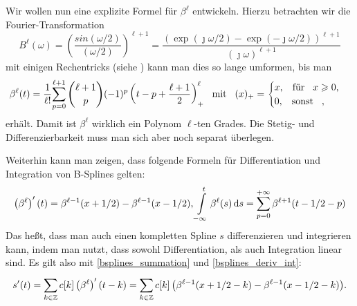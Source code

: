 Wir wollen nun eine explizite Formel f\"ur $\beta^\ell$ entwickeln. Hierzu betrachten wir die Fourier-Transformation 
\begin{equation}
    B^\ell(\omega) 
        = \left(\frac{sin(\omega / 2)}{(\omega / 2)}\right)^{\ell + 1}
        = \frac{(\exp(\jmath \omega/2) - \exp(-\jmath \omega/2))^{\ell+1}}{
            (\jmath \omega)^{\ell + 1}
        }
\end{equation}
mit einigen Rechentricks (siehe \cite[Box 1.]{unser1999splines_mag}) kann man dies so lange umformen, bis man
\begin{equation}
    \beta^\ell(t) = \frac{1}{\ell !}{\sum\limits_{p = 0}^{\ell+1}{
            \binom{\ell+1}{p}(-1)^p
            \left(t - p + \frac{\ell+1}{2}\right)_+^\ell
        }}
    {\hspace{3mm} \text{mit} \hspace{3mm}}
    (x)_+ = \begin{cases}
      x, {\hspace{3mm} \text{f\"ur} \hspace{3mm}} x \geqslant 0, \\
      0, {\hspace{3mm} \text{sonst} \hspace{3mm}},  
    \end{cases}
\end{equation}
erh\"alt. Damit ist $\beta^\ell$ wirklich ein Polynom $\ell$-ten Grades. Die Stetig- und Differenzierbarkeit muss man sich aber noch separat \"uberlegen. 

Weiterhin kann man zeigen, dass folgende Formeln f\"ur Differentiation und Integration von B-Splines gelten:
\begin{equation}\label{bsplines_deriv_int}
    \left(\beta^\ell\right)^\prime(t) =
        \beta^{\ell-1}(x + 1/2) - \beta^{\ell-1}(x - 1/2), 
    {\int\limits_{-\infty}^{t}{\beta^\ell(s)}\,\mathrm{d}{s}} = 
        {\sum\limits_{p = 0}^{+\infty}{\beta^{\ell+1}(t - 1/2 - p)}}
\end{equation}
Das he{\ss}t, dass man auch einen kompletten Spline $s$ differenzieren und integrieren kann, indem man nutzt, dass sowohl Differentiation, als auch Integration linear sind. Es gilt also mit \eqref{bsplines_summation} und \eqref{bsplines_deriv_int}:
\begin{equation}
    s^\prime(t) = {\sum\limits_{k \in \mathbb{Z}}^{}{
        c[k] \left(\beta^{\ell}\right)^\prime(t - k)
    }}
    = {\sum\limits_{k \in \mathbb{Z}}^{}{
        c[k]\left(
            \beta^{\ell-1}(x + 1/2 - k) - \beta^{\ell-1}(x - 1/2 - k)
        \right)
    }}.
\end{equation}
%
%
